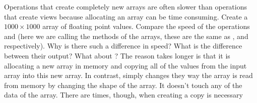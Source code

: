 \begin{problem}
Operations that create completely new arrays are often slower than operations that create views because allocating an array can be time consuming.
Create a $1000 \times 1000$ array  of floating point values.
Compare the speed of the operations  and  (here we are calling the methods of the arrays, these are the same as , and  respectively).
Why is there such a difference in speed?
What is the difference between their output?
What about ?
The reason  takes longer is that it is allocating a new array in memory and copying all of the values from the input array into this new array.
In contrast,  simply changes they way the array is read from memory by changing the shape of the array.
It doesn't touch any of the data of the array.
There are times, though, when creating a copy is necessary
\end{problem}

